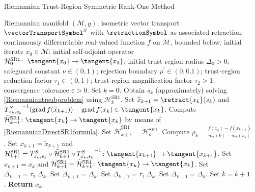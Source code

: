 \begin{algorithm}[H]
    \caption{Riemannian Trust-Region Symmetric Rank-One Method}\label{RTR-SR1Method}
    \begin{algorithmic}[1]
        \State Riemannian manifold $(\mathcal{M}, g)$; isometric vector transport $\vectorTransportSymbol^S$ with $\retractionSymbol$ as associated retraction; continuously differentiable real-valued function $f$ on $\mathcal{M}$, bounded below; initial iterate $x_0 \in \mathcal{M}$; initial self-adjoint operator $\mathcal{H}^\mathrm{SR1}_0 \colon \; \tangent{x_0} \to \tangent{x_0}$; initial trust-region radius $\Delta_0 > 0$; safeguard constant $\nu \in (0,1)$; rejection boundary $\rho^{\prime} \in (0, 0.1)$; trust-region reduction factor $\tau_1 \in (0,1)$; trust-region magnification factor $\tau_2 > 1$; convergence tolerance $\varepsilon > 0$. Set $k = 0$.
            \State Obtain $s_k$ (approximately) solving \cref{Riemanniantrsubproblem} using $\mathcal{H}^\mathrm{SR1}_k$.
            \State Set $\widetilde{x}_{k+1} = \retract{x_k}(s_k)$ and ${T^{S}_{x_k, s_k}}^{-1} ( \operatorname{grad}f(\widetilde{x}_{k+1}) ) - \operatorname{grad}f(x_k) \in \tangent{x_k}$.
                \State Compute $\widetilde{\mathcal{H}}^\mathrm{SR1}_{k+1} \colon \tangent{x_{k}} \to \tangent{x_{k}}$ by means of \cref{RiemannianDirectSR1formula}.
			\Else 
				\State Set $\widetilde{\mathcal{H}}^\mathrm{SR1}_{k+1} = \mathcal{H}^\mathrm{SR1}_k$.
            \EndIf 
            \State Compute $\rho_k = \frac{f(x_k) - f(\widetilde{x}_{k+1})}{m_k(0) - m_k(s_k)}$.
                \State Set $x_{k+1} = \widetilde{x}_{k+1}$ and $\mathcal{H}^\mathrm{SR1}_{k+1} = T^{S}_{x_k, s_k} \circ \widetilde{\mathcal{H}}^\mathrm{SR1}_{k+1} \circ  {T^{S}_{x_k, s_k}}^{-1} \colon \tangent{x_{k+1}} \to \tangent{x_{k+1}}$.
			\Else 
				\State Set $x_{k+1} = x_k$ and $\mathcal{H}^\mathrm{SR1}_{k+1} = \widetilde{\mathcal{H}}^\mathrm{SR1}_{k+1} \colon \tangent{x_{k}} \to \tangent{x_{k}}$.
            \EndIf 
                    \State Set $\Delta_{k+1} = \tau_2 \ \Delta_k$.
                \Else 
                    \State Set $\Delta_{k+1} = \Delta_k$.
                \EndIf 
			\Else 
                    \State Set $\Delta_{k+1} = \tau_1 \ \Delta_k$.
                \Else 
                    \State Set $\Delta_{k+1} = \Delta_k$.
                \EndIf 
            \EndIf 
            \State Set $k = k+1$.
        \EndWhile
        \State \textbf{Return} $x_k$.
    \end{algorithmic}
\end{algorithm}

